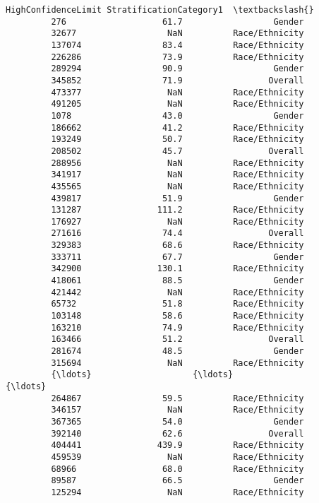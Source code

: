 \documentclass[11pt]{article}
\begin{document}
\begin{Verbatim}[commandchars=\\\{\}]
                HighConfidenceLimit StratificationCategory1  \textbackslash{}
         276                   61.7                  Gender   
         32677                  NaN          Race/Ethnicity   
         137074                83.4          Race/Ethnicity   
         226286                73.9          Race/Ethnicity   
         289294                90.9                  Gender   
         345852                71.9                 Overall   
         473377                 NaN          Race/Ethnicity   
         491205                 NaN          Race/Ethnicity   
         1078                  43.0                  Gender   
         186662                41.2          Race/Ethnicity   
         193249                50.7          Race/Ethnicity   
         208502                45.7                 Overall   
         288956                 NaN          Race/Ethnicity   
         341917                 NaN          Race/Ethnicity   
         435565                 NaN          Race/Ethnicity   
         439817                51.9                  Gender   
         131287               111.2          Race/Ethnicity   
         176927                 NaN          Race/Ethnicity   
         271616                74.4                 Overall   
         329383                68.6          Race/Ethnicity   
         333711                67.7                  Gender   
         342900               130.1          Race/Ethnicity   
         418061                88.5                  Gender   
         421442                 NaN          Race/Ethnicity   
         65732                 51.8          Race/Ethnicity   
         103148                58.6          Race/Ethnicity   
         163210                74.9          Race/Ethnicity   
         163466                51.2                 Overall   
         281674                48.5                  Gender   
         315694                 NaN          Race/Ethnicity   
         {\ldots}                    {\ldots}                     {\ldots}   
         264867                59.5          Race/Ethnicity   
         346157                 NaN          Race/Ethnicity   
         367365                54.0                  Gender   
         392140                62.6                 Overall   
         404441               439.9          Race/Ethnicity   
         459539                 NaN          Race/Ethnicity   
         68966                 68.0          Race/Ethnicity   
         89587                 66.5                  Gender   
         125294                 NaN          Race/Ethnicity   

\end{Verbatim}
\end{document}
